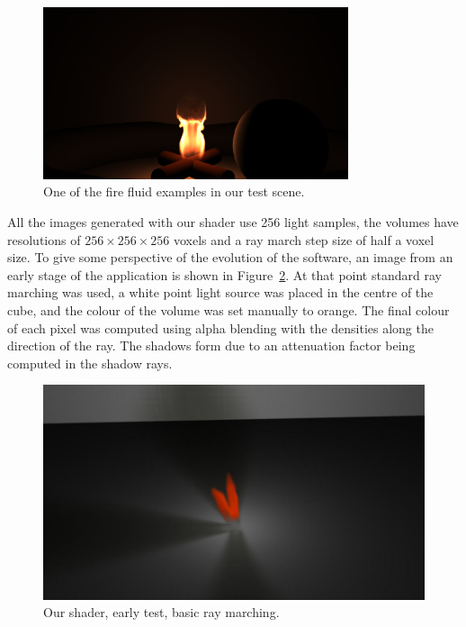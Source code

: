 \begin{figure}[htbp]
	\centering
	\includegraphics[width=0.8\textwidth, trim={8cm 0 8cm 10cm}, clip]{img/result_maya_fire_example}
	\caption{One of the \Maya fire fluid examples in our test scene.}
	\label{fig:result_maya_fire_example}
\end{figure}

All the images generated with our shader use 256 light samples, the volumes have resolutions of $256 \times 256 \times 256$ voxels and a ray march step size of half a voxel size.
To give some perspective of the evolution of the software, an image from an early stage of the application is shown in Figure~\ref{fig:result_early_stage}.
At that point standard ray marching was used, a white point light source was placed in the centre of the cube, and the colour of the volume was set manually to orange.
The final colour of each pixel was computed using alpha blending with the densities along the direction of the ray.
The shadows form due to an attenuation factor being computed in the shadow rays.

\begin{figure}[htbp]
	\centering
	\includegraphics[width=\textwidth]{img/result_early_stage}
	\caption{Our shader, early test, basic ray marching.}
	\label{fig:result_early_stage}
\end{figure}

